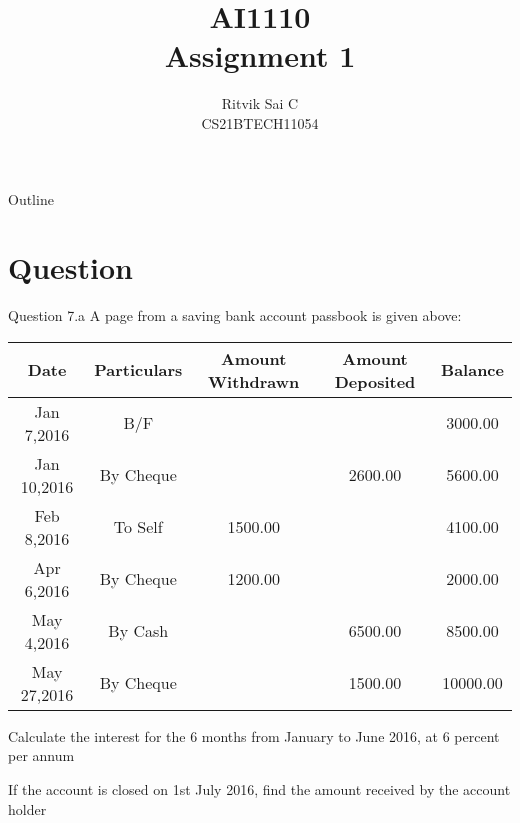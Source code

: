 \documentclass{beamer}
\title{AI1110 \\ Assignment 1}
\author{Ritvik Sai C \\ CS21BTECH11054}
\date{}
\begin{document}
	\begin{frame}
		\titlepage
	\end{frame}
	
	\begin{frame}{Outline}
    		\tableofcontents
	\end{frame}
	
	\section{Question}
	\begin{frame}{Question 7.a}
A page from a saving bank account passbook is given above:\\

\end{frame}

\begin{frame}
\begin{table}[ht]
\begin{tabular}{|c|c|c|c|c|}
\hline
Date & Particulars & Amount Withdrawn & Amount Deposited & Balance\\
\hline
Jan 7,2016 & B/F & & & 3000.00\\
\hline
Jan 10,2016 & By Cheque & & 2600.00 & 5600.00\\
\hline
Feb 8,2016 & To Self & 1500.00 & & 4100.00\\
\hline
Apr 6,2016 & By Cheque & 1200.00 & & 2000.00\\
\hline
May 4,2016 & By Cash & & 6500.00 & 8500.00\\
\hline
May 27,2016 & By Cheque & & 1500.00 & 10000.00\\
\hline
\end{tabular}
\end{table}
\end{frame}

\begin{frame}

Calculate the interest for the 6 months from January to June 2016, at 6 percent per annum\\

\end{frame}

\begin{frame}
 If the account is closed on 1st July 2016, find the amount received by the account holder\\

\end{frame}
	
\end{document}
